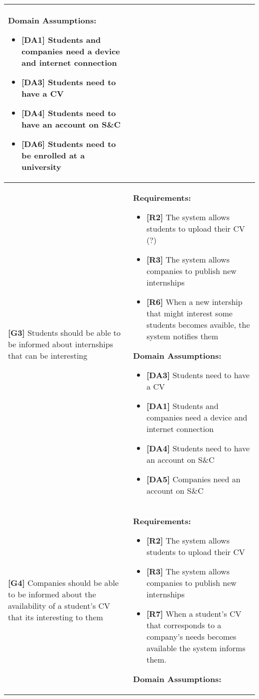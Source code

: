 \begin{longtable}{|p{}|p{}|}
\textbf{Domain Assumptions:}
\begin{itemize}
    \item \textbf{[DA1]} Students and companies need a device and internet connection
    \item \textbf{[DA3]} Students need to have a CV
    \item \textbf{[DA4]} Students need to have an account on S\&C
    \item \textbf{[DA6]} Students need to be enrolled at a university
\end{itemize} \\
\hline
\textbf{[G3]} Students should be able to be informed about internships that can be interesting 
& 
\textbf{Requirements:}
\begin{itemize}
    \item \textbf{[R2]} The system allows students to upload their CV (?)
    \item \textbf{[R3]} The system allows companies to publish new internships
    \item \textbf{[R6]} When a new intership that might interest some students becomes avaible, the system notifies them
\end{itemize}
\textbf{Domain Assumptions:}
\begin{itemize}
    \item \textbf{[DA3]} Students need to have a CV
    \item \textbf{[DA1]} Students and companies need a device and internet connection
    \item \textbf{[DA4]} Students need to have an account on S\&C
    \item \textbf{[DA5]} Companies need an account on S\&C
\end{itemize} \\
\hline
\textbf{[G4]} Companies should be able to be informed about the availability of a student's CV that its interesting to them
& 
\textbf{Requirements:}
\begin{itemize}
    \item \textbf{[R2]} The system allows students to upload their CV
    \item \textbf{[R3]} The system allows companies to publish new internships
    \item \textbf{[R7]} When a student’s CV that corresponds to a company’s needs becomes available the system informs them.
\end{itemize}
\textbf{Domain Assumptions:}
\begin{itemize}

\end{itemize}
\end{longtable}
